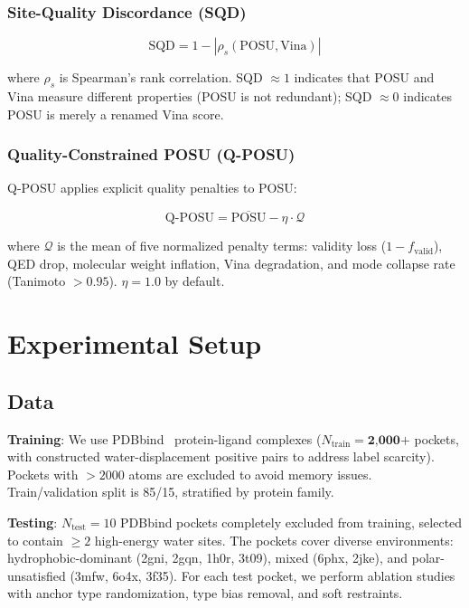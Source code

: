 \documentclass[journal=jcisd,manuscript=article]{achemso}
\begin{document}
\subsubsection{Site-Quality Discordance (SQD)}

\begin{equation}
\text{SQD} = 1 - |\rho_s(\text{POSU}, \text{Vina})|
\end{equation}

where $\rho_s$ is Spearman's rank correlation. SQD $\approx 1$ indicates
that POSU and Vina measure different properties (POSU is not redundant);
SQD $\approx 0$ indicates POSU is merely a renamed Vina score.

\subsubsection{Quality-Constrained POSU (Q-POSU)}

Q-POSU applies explicit quality penalties to POSU:

\begin{equation}
\text{Q-POSU} = \overline{\text{POSU}} - \eta \cdot \mathcal{Q}
\end{equation}

where $\mathcal{Q}$ is the mean of five normalized penalty terms:
validity loss ($1 - f_{\text{valid}}$), QED drop, molecular weight inflation,
Vina degradation, and mode collapse rate (Tanimoto $> 0.95$). $\eta = 1.0$
by default.

\section{Experimental Setup}

\subsection{Data}

\textbf{Training}: We use PDBbind~\cite{RN18} protein-ligand complexes
($N_{\text{train}} = \textbf{2,000+}$ pockets, with constructed water-displacement
positive pairs to address label scarcity). Pockets with $> 2000$ atoms are excluded to avoid
memory issues. Train/validation split is 85/15, stratified by protein family.

\textbf{Testing}: $N_{\text{test}} = 10$ PDBbind pockets completely excluded
from training, selected to contain $\geq 2$ high-energy water sites.
The pockets cover diverse environments: hydrophobic-dominant (2gni, 2gqn, 1h0r, 3t09),
mixed (6phx, 2jke), and polar-unsatisfied (3mfw, 6o4x, 3f35). For each test pocket,
we perform ablation studies with anchor type randomization, type bias removal,
and soft restraints.
\end{document}

